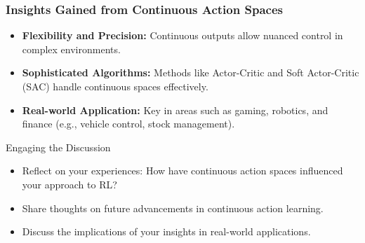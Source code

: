 \documentclass[aspectratio=169]{beamer}
\begin{document}
\begin{frame}[fragile]
    \frametitle{Insights Gained from Continuous Action Spaces}
    \begin{itemize}
        \item \textbf{Flexibility and Precision:} Continuous outputs allow nuanced control in complex environments.
        \item \textbf{Sophisticated Algorithms:} Methods like Actor-Critic and Soft Actor-Critic (SAC) handle continuous spaces effectively.
        \item \textbf{Real-world Application:} Key in areas such as gaming, robotics, and finance (e.g., vehicle control, stock management).
    \end{itemize}

    \begin{block}{Engaging the Discussion}
        \begin{itemize}
            \item Reflect on your experiences: How have continuous action spaces influenced your approach to RL?
            \item Share thoughts on future advancements in continuous action learning.
            \item Discuss the implications of your insights in real-world applications.
        \end{itemize}
    \end{block}
\end{frame}
\end{document}
